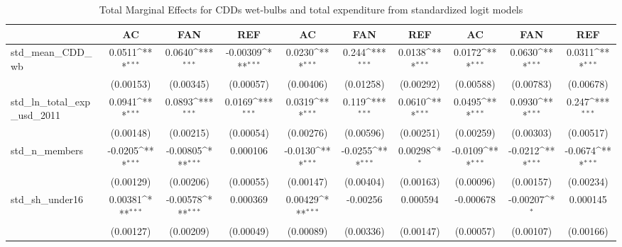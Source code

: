 \begin{table}[htbp]\centering\footnotesize{
\def\sym#1{\ifmmode^{#1}\else\(^{#1}\)\fi}
\caption{Total Marginal Effects for CDDs wet-bulbs and total expenditure from standardized logit models \label{table_S7}}
\begin{tabular}{l*{9}{c}}
\hline\hline
            &\multicolumn{1}{c}{AC}&\multicolumn{1}{c}{FAN}&\multicolumn{1}{c}{REF}&\multicolumn{1}{c}{AC}&\multicolumn{1}{c}{FAN}&\multicolumn{1}{c}{REF}&\multicolumn{1}{c}{AC}&\multicolumn{1}{c}{FAN}&\multicolumn{1}{c}{REF}\\
\hline
std_mean_CDD_wb&      0.0511\sym{***}&      0.0640\sym{***}&    -0.00309\sym{***}&      0.0230\sym{***}&       0.244\sym{***}&      0.0138\sym{***}&      0.0172\sym{***}&      0.0630\sym{***}&      0.0311\sym{***}\\
            &   (0.00153)         &   (0.00345)         &   (0.00057)         &   (0.00406)         &   (0.01258)         &   (0.00292)         &   (0.00588)         &   (0.00783)         &   (0.00678)         \\
std_ln_total_exp_usd_2011&      0.0941\sym{***}&      0.0893\sym{***}&      0.0169\sym{***}&      0.0319\sym{***}&       0.119\sym{***}&      0.0610\sym{***}&      0.0495\sym{***}&      0.0930\sym{***}&       0.247\sym{***}\\
            &   (0.00148)         &   (0.00215)         &   (0.00054)         &   (0.00276)         &   (0.00596)         &   (0.00251)         &   (0.00259)         &   (0.00303)         &   (0.00517)         \\
std_n_members&     -0.0205\sym{***}&    -0.00805\sym{***}&    0.000106         &     -0.0130\sym{***}&     -0.0255\sym{***}&     0.00298\sym{*}  &     -0.0109\sym{***}&     -0.0212\sym{***}&     -0.0674\sym{***}\\
            &   (0.00129)         &   (0.00206)         &   (0.00055)         &   (0.00147)         &   (0.00404)         &   (0.00163)         &   (0.00096)         &   (0.00157)         &   (0.00234)         \\
std_sh_under16&     0.00381\sym{***}&    -0.00578\sym{***}&    0.000369         &     0.00429\sym{***}&    -0.00256         &    0.000594         &   -0.000678         &    -0.00207\sym{*}  &    0.000145         \\
            &   (0.00127)         &   (0.00209)         &   (0.00049)         &   (0.00089)         &   (0.00336)         &   (0.00147)         &   (0.00057)         &   (0.00107)         &   (0.00166)         \\

\end{tabular}}
\end{table}
